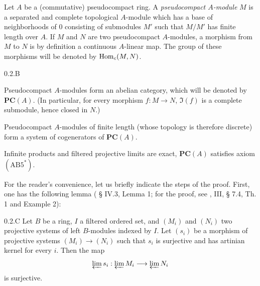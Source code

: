 Let $A$ be a (commutative) pseudocompact ring. A \emph{pseudocompact $A$-module} $M$ is a separated and complete topological $A$-module which has a base of neighborhoods of $0$ consisting of submodules $M'$ such that $M/M'$ has finite length over $A$.
If $M$ and $N$ are two pseudocompact $A$-modules, a morphism from $M$ to $N$ is by definition a continuous $A$-linear map. The group of these morphisms will be denoted by $\Hom_c(M,N)$.

\begin{proposition}{0.2.B}\label{VIIB.0.2.B}
\begin{enumeratei}
\item Pseudocompact $A$-modules form an abelian category, which will be denoted by $\mathbf{PC}(A)$. (In particular, for every morphism $f:M\to N$, $\Im(f)$ is a complete submodule, hence closed in $N$.)
\item Pseudocompact $A$-modules of finite length (whose topology is therefore discrete) form a system of cogenerators of $\mathbf{PC}(A)$.
\item Infinite products and filtered projective limits are exact, \ie $\mathbf{PC}(A)$ satisfies axiom $(\mathrm{AB}5^*)$.
\end{enumeratei}
\end{proposition}
For the reader's convenience, let us briefly indicate the steps of the proof. First, one has the following lemma (\cite{CA} § IV.3, Lemma 1; for the proof, see \cite{BEns}, III, § 7.4, Th. 1 and Example 2):

\begin{lemma}{0.2.C}\label{VIIB.0.2.C}
Let $B$ be a ring, $I$ a filtered ordered set, and $(M_i)$ and $(N_i)$ two projective systems of left $B$-modules indexed by $I$. Let $(s_i)$ be a morphism of projective systems $(M_i)\to(N_i)$ such that $s_i$ is surjective and has artinian kernel for every $i$. Then the map
\[
\varprojlim s_i:\varprojlim M_i\to\varprojlim N_i
\]
is surjective.
\end{lemma}

